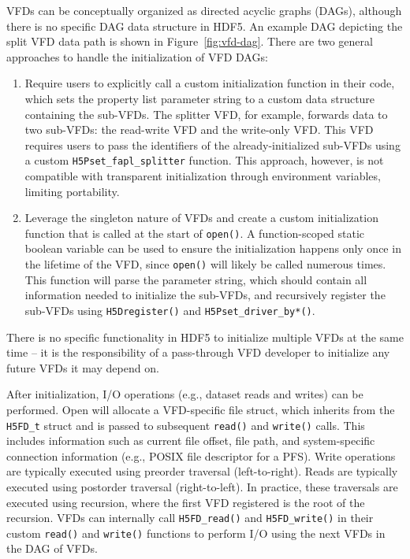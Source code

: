 VFDs can be conceptually organized as directed acyclic graphs (DAGs), although there is no specific DAG data structure in HDF5. An example DAG depicting the split VFD data path is shown in Figure~\ref{fig:vfd-dag}. There are two general approaches to handle the initialization of VFD DAGs:
\begin{enumerate}
    \item Require users to explicitly call a custom initialization function in their code, which sets the property list parameter string to a custom data structure containing the sub-VFDs. The splitter VFD, for example, forwards data to two sub-VFDs: the read-write VFD and the write-only VFD. This VFD requires users to pass the identifiers of the already-initialized sub-VFDs using a custom \texttt{H5Pset\_fapl\_splitter} function. This approach, however, is not compatible with transparent initialization through environment variables, limiting portability.
    \item Leverage the singleton nature of VFDs and create a custom initialization function that is called at the start of \texttt{open()}. A function-scoped static boolean variable can be used to ensure the initialization happens only once in the lifetime of the VFD, since \texttt{open()} will likely be called numerous times. This function will parse the parameter string, which should contain all information needed to initialize the sub-VFDs, and recursively register the sub-VFDs using \texttt{H5Dregister()} and \texttt{H5Pset\_driver\_by*()}.
\end{enumerate}
There is no specific functionality in HDF5 to initialize multiple VFDs at the same time -- it is the responsibility of a pass-through VFD developer to initialize any future VFDs it may depend on.

After initialization, I/O operations (e.g., dataset reads and writes) can be performed. Open will allocate a VFD-specific file struct, which inherits from the \texttt{H5FD\_t} struct and is passed to subsequent \texttt{read()} and \texttt{write()} calls. This includes information such as current file offset, file path, and system-specific connection information (e.g., POSIX file descriptor for a PFS). Write operations are typically executed using preorder traversal (left-to-right). Reads are typically executed using postorder traversal (right-to-left). In practice, these traversals are executed using recursion, where the first VFD registered is the root of the recursion. VFDs can internally call \texttt{H5FD_read()} and \texttt{H5FD_write()} in their custom \texttt{read()} and \texttt{write()} functions to perform I/O using the next VFDs in the DAG of VFDs.

